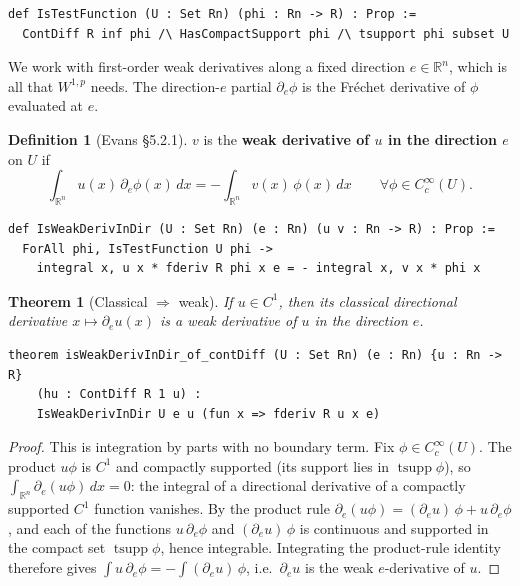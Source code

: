 ﻿\documentclass[12pt, a4paper]{article}
\renewcommand{\_}{\origunderscore\allowbreak}
\theoremstyle{definition}
\newtheorem{definition}{Definition}[section]
\theoremstyle{plain}
\newtheorem{theorem}{Theorem}[section]
\begin{document}
\begin{lstlisting}[caption={Test functions}]
def IsTestFunction (U : Set Rn) (phi : Rn -> R) : Prop :=
  ContDiff R inf phi /\ HasCompactSupport phi /\ tsupport phi subset U
\end{lstlisting}

We work with first-order weak derivatives along a fixed direction $e \in \mathbb{R}^n$,
which is all that $W^{1,p}$ needs. The direction-$e$ partial $\partial_e\phi$ is the
Fréchet derivative of $\phi$ evaluated at $e$.

\begin{definition}[Evans §5.2.1]
$v$ is the \textbf{weak derivative of $u$ in the direction $e$} on $U$ if
\[
  \int_{\mathbb{R}^n} u(x)\, \partial_e \phi(x)\, dx
  = -\int_{\mathbb{R}^n} v(x)\, \phi(x)\, dx
  \qquad \forall \phi \in C^\infty_c(U).
\]
\end{definition}

\begin{lstlisting}[caption={Weak directional derivative}]
def IsWeakDerivInDir (U : Set Rn) (e : Rn) (u v : Rn -> R) : Prop :=
  ForAll phi, IsTestFunction U phi ->
    integral x, u x * fderiv R phi x e = - integral x, v x * phi x
\end{lstlisting}

\begin{theorem}[Classical $\Rightarrow$ weak]
If $u \in C^1$, then its classical directional derivative $x \mapsto \partial_e u(x)$
is a weak derivative of $u$ in the direction $e$.
\end{theorem}

\begin{lstlisting}[caption={Classical derivative is the weak derivative (proved)}]
theorem isWeakDerivInDir_of_contDiff (U : Set Rn) (e : Rn) {u : Rn -> R}
    (hu : ContDiff R 1 u) :
    IsWeakDerivInDir U e u (fun x => fderiv R u x e)
\end{lstlisting}

\begin{proof}
This is integration by parts with no boundary term. Fix $\phi\in C^\infty_c(U)$. The
product $u\phi$ is $C^1$ and compactly supported (its support lies in
$\operatorname{tsupp}\phi$), so $\int_{\mathbb{R}^n}\partial_e(u\phi)\,dx=0$: the integral
of a directional derivative of a compactly supported $C^1$ function vanishes. By the
product rule $\partial_e(u\phi)=(\partial_e u)\,\phi+u\,\partial_e\phi$, and each of the
functions $u\,\partial_e\phi$ and $(\partial_e u)\,\phi$ is continuous and supported in the
compact set $\operatorname{tsupp}\phi$, hence integrable. Integrating the product-rule
identity therefore gives $\int u\,\partial_e\phi=-\int(\partial_e u)\,\phi$, i.e.\
$\partial_e u$ is the weak $e$-derivative of $u$.
\end{proof}
\end{document}
